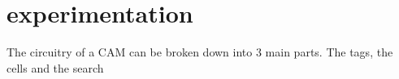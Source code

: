 \section{experimentation}
The circuitry of a CAM can be broken down into 3 main parts. The tags, the cells and the search
